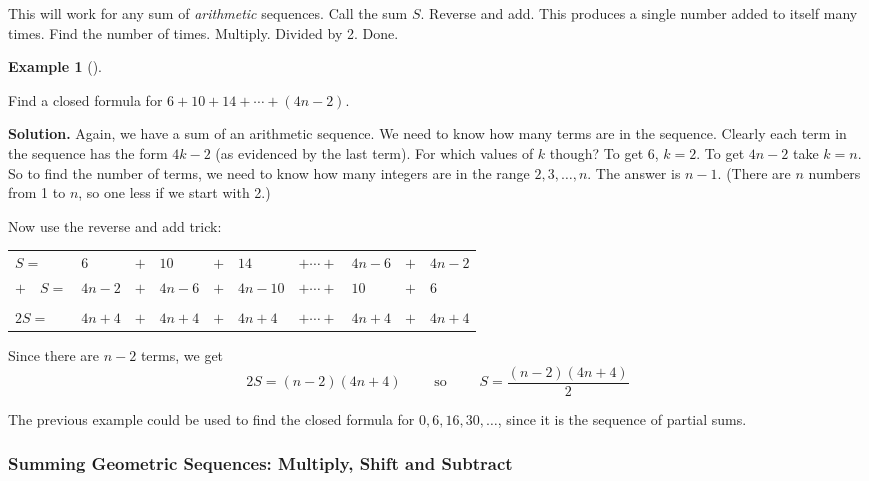 \documentclass[10pt,]{book}
\theoremstyle{plain}
\theoremstyle{definition}
\newtheorem{example}[theorem]{Example}
\theoremstyle{definition}
\theoremstyle{definition}
\numberwithin{equation}{chapter}
\newcommand{\hrulethin}  {\noalign{\hrule height 0.04em}}
\begin{document}
        This will work for any sum of \emph{arithmetic} sequences. Call the sum \(S\). Reverse and add. This produces a single number added to itself many times. Find the number of times. Multiply. Divided by 2. Done.
\begin{example}[]\label{example-64}

            Find a closed formula for \(6 + 10 + 14 + \cdots + (4n - 2)\).
\par\medskip\noindent%
\textbf{Solution.}\quad
            Again, we have a sum of an arithmetic sequence. We need to know how many terms are in the sequence. Clearly each term in the sequence has the form \(4k -2\) (as evidenced by the last term). For which values of \(k\) though? To get 6, \(k = 2\). To get \(4n-2\) take \(k = n\). So to find the number of terms, we need to know how many integers are in the range \(2,3,\ldots, n\). The answer is \(n-1\). (There are \(n\) numbers from 1 to \(n\), so one less if we start with 2.)
\par

            Now use the reverse and add trick:
\begin{tabular}{llllllllll}
\(S  =\)&\(6\)&\(+\)&\(10\)&\(+\)&\(14\)&\(+ \cdots +\)&\(4n-6\)&\(+\)&\(4n-2\)\tabularnewline[0pt]
\(+ \quad S  =\)&\(4n-2\)&\(+\)&\(4n-6\)&\(+\)&\(4n-10\)&\(+ \cdots +\)&\(10\)&\(+\)&6\tabularnewline[0pt]
&&&&&&&&&\tabularnewline\hrulethin
\(2S  =\)&\(4n+4\)&\(+\)&\(4n+4\)&\(+\)&\(4n+4\)&\(+ \cdots +\)&\(4n+4\)&\(+\)&\(4n+4\)\tabularnewline[0pt]

\end{tabular}
\par

            Since there are \(n-2\) terms, we get
            \begin{equation*}
              2S = (n-2)(4n+4)\qquad \mbox{ so } \qquad S = \frac{(n-2)(4n+4)}{2}
            \end{equation*}
\end{example}
\par

        The previous example could be used to find the closed formula for \(0, 6, 16, 30, \ldots\), since it is the sequence of partial sums.
\typeout{************************************************}
\typeout{************************************************}
\subsubsection[Summing Geometric Sequences: Multiply, Shift and Subtract]{Summing Geometric Sequences: Multiply, Shift and Subtract}\label{subsubsection-2}
\end{document}
